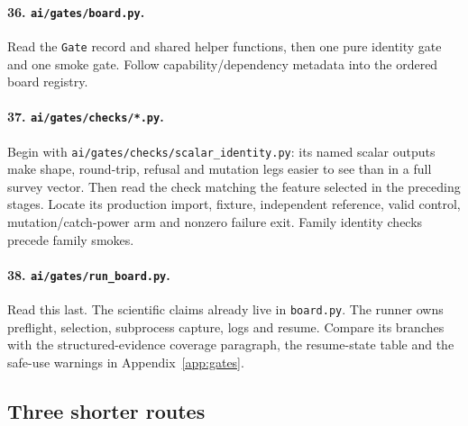 \documentclass[10pt,aps,prd,twocolumn,nofootinbib]{revtex4-2}
\newcommand{\code}[1]{\texttt{#1}}
\begin{document}
\paragraph{36.  \code{ai/gates/board.py}.}
Read the \code{Gate} record and shared helper functions, then one pure identity
gate and one smoke gate.  Follow capability/dependency metadata into the
ordered board registry.

\paragraph{37.  \code{ai/gates/checks/*.py}.}
Begin with \code{ai/gates/checks/scalar\_identity.py}: its named scalar outputs
make shape, round-trip, refusal and mutation legs easier to see than in a
full survey vector.  Then read the check matching the feature selected in the
preceding stages.  Locate its production import,
fixture, independent reference, valid control, mutation/catch-power arm and
nonzero failure exit.  Family identity checks precede family smokes.

\paragraph{38.  \code{ai/gates/run\_board.py}.}
Read this last.  The scientific claims already live in \code{board.py}.  The
runner owns preflight, selection, subprocess capture, logs and resume.  Compare
its branches with the structured-evidence coverage paragraph, the resume-state
table and the safe-use warnings in Appendix~\ref{app:gates}.

\subsection{Three shorter routes}
\end{document}
